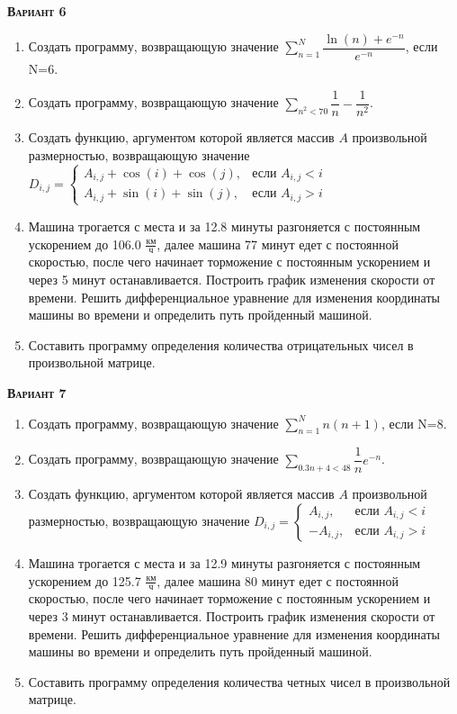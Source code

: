 \textsc{\textbf{Вариант 6}}
\begin{enumerate}
\item  Создать программу, возвращающую значение $\sum\limits_{n=1}^{N} \dfrac{\ln(n)+e^{-n}}{e^{-n}} $, если N=6. 
\item  Создать программу, возвращающую значение $\sum\limits_{n^2<      70} {\dfrac{1}{n} -\dfrac{1}{n^2}}$. 
\item Создать функцию, аргументом которой является массив $A$ произвольной размерностью, возвращающую значение $D_{i,j}=\begin{cases} A_{i,j}+\cos(i)+\cos(j), & \text{если } {A_{i,j}}<i \\  A_{i,j}+\sin(i)+\sin(j), & \text{если } {A_{i,j}}>i \end{cases}$ 
\item Машина трогается с места и за 12.8 минуты разгоняется с постоянным ускорением до 106.0 ${\frac{км}{ч}}$, далее машина   77 минут едет с постоянной скоростью, после чего начинает торможение с постоянным ускорением и через   5 минут останавливается. Построить график изменения скорости от времени. Решить дифференциальное уравнение для изменения координаты машины во времени и определить путь пройденный машиной.  \item Составить программу определения количества отрицательных чисел в произвольной матрице.                                                                                                                                                  

\end{enumerate}
\textsc{\textbf{Вариант 7}}
\begin{enumerate}
\item  Создать программу, возвращающую значение $\sum\limits_{n=1}^{N} {n (n+1)}                     $, если N=8. 
\item  Создать программу, возвращающую значение $\sum\limits_{0.3n+4<   48} {\dfrac{1}{n} e^{-n}}         $. 
\item Создать функцию, аргументом которой является массив $A$ произвольной размерностью, возвращающую значение $D_{i,j}=\begin{cases} A_{i,j}, & \text{если } {A_{i,j}}<i \\  -A_{i,j}, & \text{если } {A_{i,j}}>i \end{cases}                               $ 
\item Машина трогается с места и за 12.9 минуты разгоняется с постоянным ускорением до 125.7 ${\frac{км}{ч}}$, далее машина   80 минут едет с постоянной скоростью, после чего начинает торможение с постоянным ускорением и через   3 минут останавливается. Построить график изменения скорости от времени. Решить дифференциальное уравнение для изменения координаты машины во времени и определить путь пройденный машиной.  \item Составить программу определения количества четных чисел в произвольной матрице.                                                                                                                                                                

\end{enumerate}
